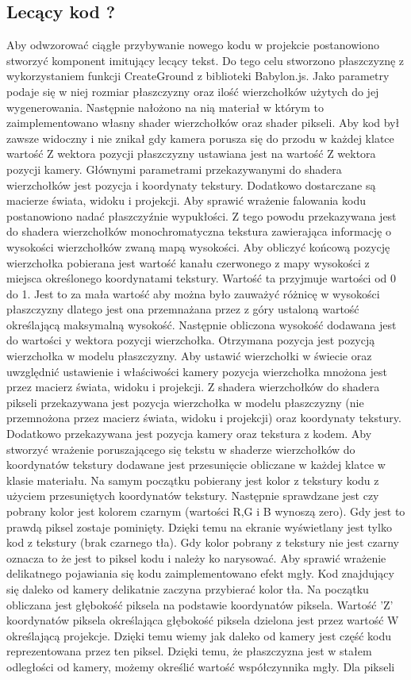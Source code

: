 \documentclass[11pt,a4paper,polish,thesis]{dcsbook}
\begin{document}
	\subsection{Lecący kod ?}
	
	Aby odwzorować ciągłe przybywanie nowego kodu w projekcie postanowiono stworzyć komponent imitujący lecący tekst. Do tego celu stworzono płaszczyznę z wykorzystaniem funkcji CreateGround z biblioteki Babylon.js. Jako parametry podaje się w niej rozmiar płaszczyzny oraz ilość wierzchołków użytych do jej wygenerowania. Następnie nałożono na nią materiał w którym to zaimplementowano własny shader wierzchołków oraz shader pikseli. Aby kod był zawsze widoczny i nie znikał gdy kamera porusza się do przodu w każdej klatce wartość Z wektora pozycji płaszczyzny ustawiana jest na wartość Z wektora pozycji kamery. Głównymi parametrami przekazywanymi do shadera wierzchołków jest pozycja i koordynaty tekstury. Dodatkowo dostarczane są macierze świata, widoku i projekcji. Aby sprawić wrażenie falowania kodu postanowiono nadać płaszczyźnie wypukłości. Z tego powodu przekazywana jest do shadera wierzchołków monochromatyczna tekstura zawierająca informację o wysokości wierzchołków zwaną mapą wysokości. Aby obliczyć końcową pozycję wierzchołka pobierana jest wartość kanału czerwonego z mapy wysokości z miejsca określonego koordynatami tekstury. Wartość ta przyjmuje wartości od 0 do 1. Jest to za mała wartość aby można było zauważyć różnicę w wysokości płaszczyzny dlatego jest ona przemnażana przez z góry ustaloną wartość określającą maksymalną wysokość. Następnie obliczona wysokość dodawana jest do wartości y wektora pozycji wierzchołka. Otrzymana pozycja jest pozycją wierzchołka w modelu płaszczyzny. Aby ustawić wierzchołki w świecie oraz uwzględnić ustawienie i właściwości kamery pozycja wierzchołka mnożona jest przez macierz świata, widoku i projekcji. Z shadera wierzchołków do shadera pikseli przekazywana jest pozycja wierzchołka w modelu płaszczyzny (nie przemnożona przez macierz świata, widoku i projekcji) oraz koordynaty tekstury. Dodatkowo przekazywana jest pozycja kamery oraz tekstura z kodem. Aby stworzyć wrażenie poruszającego się tekstu w shaderze wierzchołków do koordynatów tekstury dodawane jest przesunięcie obliczane w każdej klatce w klasie materiału. Na samym początku pobierany jest kolor z tekstury kodu z użyciem przesuniętych koordynatów tekstury. Następnie sprawdzane jest czy pobrany kolor jest kolorem czarnym (wartości R,G i B wynoszą zero). Gdy jest to prawdą piksel zostaje pominięty. Dzięki temu na ekranie wyświetlany jest tylko kod z tekstury (brak czarnego tła). Gdy kolor pobrany z tekstury nie jest czarny oznacza to że jest to piksel kodu i należy ko narysować. Aby sprawić wrażenie delikatnego pojawiania się kodu zaimplementowano efekt mgły. Kod znajdujący się daleko od kamery delikatnie zaczyna przybierać kolor tła. Na początku obliczana jest głębokość piksela na podstawie koordynatów piksela. Wartość 'Z' koordynatów piksela określająca głębokość piksela dzielona jest przez wartość W określającą projekcje. Dzięki temu wiemy jak daleko od kamery jest część kodu reprezentowana przez ten piksel. Dzięki temu, że płaszczyzna jest w stałem odległości od kamery, możemy określić wartość współczynnika mgły. Dla pikseli 
\end{document}
